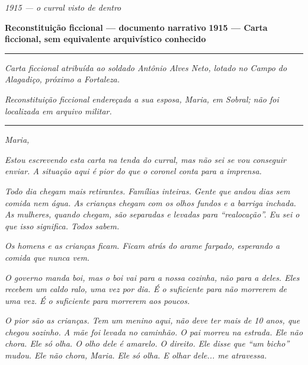 
\noindent \textit{1915 --- o curral visto de dentro}

\noindent \textbf{Reconstituição ficcional --- documento narrativo}
\textbf{1915 --- Carta ficcional, sem equivalente arquivístico conhecido}

\vspace{0.5em}\noindent\rule{\textwidth}{0.5pt}\vspace{0.5em}

\noindent \textit{Carta ficcional atribuída ao soldado Antônio Alves Neto, lotado no Campo do Alagadiço, próximo a Fortaleza.}

\noindent \textit{Reconstituição ficcional endereçada a sua esposa, Maria, em Sobral; não foi localizada em arquivo militar.}

\vspace{0.5em}\noindent\rule{\textwidth}{0.5pt}\vspace{0.5em}

\noindent \textit{Maria,}

\noindent \textit{Estou escrevendo esta carta na tenda do curral, mas não sei se vou conseguir enviar. A situação aqui é pior do que o coronel conta para a imprensa.}

\noindent \textit{Todo dia chegam mais retirantes. Famílias inteiras. Gente que andou dias sem comida nem água. As crianças chegam com os olhos fundos e a barriga inchada. As mulheres, quando chegam, são separadas e levadas para \textquotedblleft{}realocação\textquotedblright{}. Eu sei o que isso significa. Todos sabem.}

\noindent \textit{Os homens e as crianças ficam. Ficam atrás do arame farpado, esperando a comida que nunca vem.}

\noindent \textit{O governo manda boi, mas o boi vai para a nossa cozinha, não para a deles. Eles recebem um caldo ralo, uma vez por dia. É o suficiente para não morrerem de uma vez. É o suficiente para morrerem aos poucos.}

\noindent \textit{O pior são as crianças. Tem um menino aqui, não deve ter mais de 10 anos, que chegou sozinho. A mãe foi levada no caminhão. O pai morreu na estrada. Ele não chora. Ele só olha. O olho dele é amarelo. O direito. Ele disse que \textquotedblleft{}um bicho\textquotedblright{} mudou. Ele não chora, Maria. Ele só olha. E olhar dele... me atravessa.}


